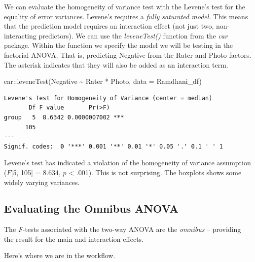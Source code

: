 \documentclass[
  11pt,
]{book}
\newenvironment{Shaded}{\begin{snugshade}}{\end{snugshade}}
\newcommand{\AttributeTok}[1]{\textcolor[rgb]{0.77,0.63,0.00}{#1}}
\newcommand{\FunctionTok}[1]{\textcolor[rgb]{0.00,0.00,0.00}{#1}}
\newcommand{\NormalTok}[1]{#1}
\newcommand{\SpecialCharTok}[1]{\textcolor[rgb]{0.00,0.00,0.00}{#1}}
\begin{document}
We can evaluate the homogeneity of variance test with the Levene's test for the equality of error variances. Levene's requires a \emph{fully saturated model.} This means that the prediction model requires an interaction effect (not just two, non-interacting predictors). We can use the \emph{leveneTest()} function from the \emph{car} package. Within the function we specify the model we will be testing in the factorial ANOVA. That is, predicting Negative from the Rater and Photo factors. The asterisk indicates that they will also be added as an interaction term.

\begin{Shaded}
\begin{Highlighting}[]
\NormalTok{car}\SpecialCharTok{::}\FunctionTok{leveneTest}\NormalTok{(Negative }\SpecialCharTok{\textasciitilde{}}\NormalTok{ Rater }\SpecialCharTok{*}\NormalTok{ Photo, }\AttributeTok{data =}\NormalTok{ Ramdhani\_df)}
\end{Highlighting}
\end{Shaded}

\begin{verbatim}
Levene's Test for Homogeneity of Variance (center = median)
       Df F value       Pr(>F)    
group   5  8.6342 0.0000007002 ***
      105                         
---
Signif. codes:  0 '***' 0.001 '**' 0.01 '*' 0.05 '.' 0.1 ' ' 1
\end{verbatim}

Levene's test has indicated a violation of the homogeneity of variance assumption (\(F\){[}5, 105{]} = 8.634, \(p\) \textless{} .001). This is not surprising. The boxplots shows some widely varying variances.

\hypertarget{evaluating-the-omnibus-anova}{%
\subsection{Evaluating the Omnibus ANOVA}\label{evaluating-the-omnibus-anova}}

The \emph{F}-tests associated with the two-way ANOVA are the \emph{omnibus} -- providing the result for the main and interaction effects.

Here's where we are in the workflow.
\end{document}
